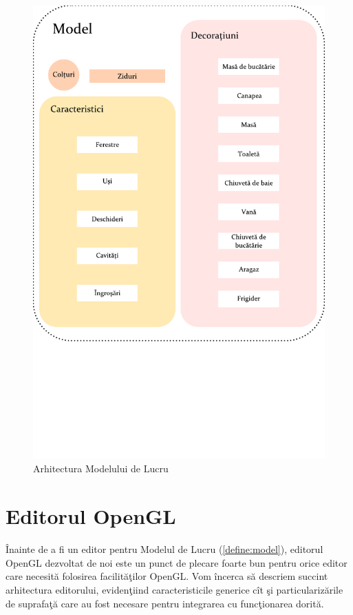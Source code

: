 \begin{figure}[htp]
\begin{center} 
\includegraphics[width=\textwidth]{figures/drawing.pdf} \caption{Arhitectura 
Modelului de Lucru}
  \label{figure:model-arh}
\end{center}
\end{figure}


\section{Editorul OpenGL}
\label{section:opengl-editor}

Înainte de a fi un editor pentru Modelul de Lucru (\ref{define:model}), 
editorul OpenGL dezvoltat de noi este un punct de plecare foarte bun pentru 
orice editor care necesită folosirea facilităţilor OpenGL. Vom încerca să 
descriem succint arhitectura editorului, evidenţiind caracteristicile generice 
cît şi particularizările de suprafaţă care au fost necesare pentru integrarea 
cu funcţionarea dorită.

